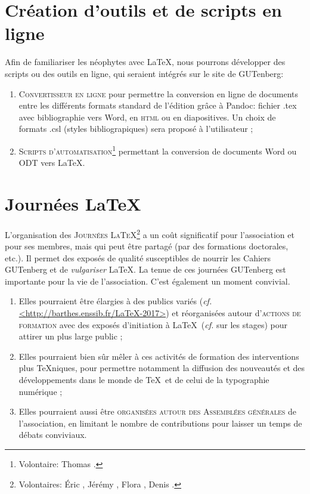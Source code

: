 \documentclass{tufte-handout}
\newcommand{\ratio}[3][]{\marginpar{\footnotesize{\textcolor{teal}{Temps requis: #2 / Utilité: #3}\par\noindent \textcolor{teal}{#1}}}}
\begin{document}
\section{Création d'outils et de scripts en ligne}

Afin de familiariser les néophytes avec \LaTeX\ratio[Petites contributions, par
les connaisseurs]{++}{+++}, nous pourrons développer des scripts ou des outils
en ligne, qui seraient intégrés sur le site de GUTenberg:

\begin{enumerate}
\item\textsc{Convertisseur en ligne} pour permettre la conversion en ligne de
  documents entre les différents formats standard de l'édition grâce à Pandoc:
  fichier .tex avec bibliographie vers Word, en \textsc{html} ou en
  diapositives. Un choix de formats .csl (styles bibliograpiques) sera proposé
  à l'utilisateur ;
\item\textsc{Scripts d'automatisation}\footnote{Volontaire: Thomas
    .} permettant la conversion de documents Word ou ODT vers
  \LaTeX.
\end{enumerate}


\section{Journées \LaTeX}

L'organisation des \textsc{Journées \LaTeX}\ratio[Coûteuses, mais utiles et
susceptibles de s'intégrer dans les autres
projets]{+++}{+++}\footnote{Volontaires: Éric , Jérémy ,
  Flora , Denis .} a un coût significatif pour
l'association et pour ses membres, mais qui peut être partagé (par des
formations doctorales, etc.). Il permet des exposés de qualité susceptibles de
nourrir les Cahiers GUTenberg et de \emph{vulgariser} \LaTeX. La tenue de ces
journées GUTenberg est importante pour la vie de l'association. C'est également
un moment convivial.

\begin{enumerate}
\item Elles pourraient être élargies à des publics variés (\emph{cf.}
  \url{<http://barthes.enssib.fr/LaTeX-2017>}) et réorganisées autour
  d'\textsc{actions de formation} avec des exposés d'initiation à \LaTeX\
  (\emph{cf.} sur les stages) pour attirer un plus large public ;
\item Elles pourraient bien sûr mêler à ces activités de formation des
  interventions plus \TeX niques, pour permettre notamment la diffusion des
  nouveautés et des développements dans le monde de \TeX\ et de celui de la
  typographie numérique ;
\item Elles pourraient aussi être \textsc{organisées autour des Assemblées
    générales} de l'association, en limitant le nombre de contributions pour
  laisser un temps de débats conviviaux.
\end{enumerate}
\end{document}
